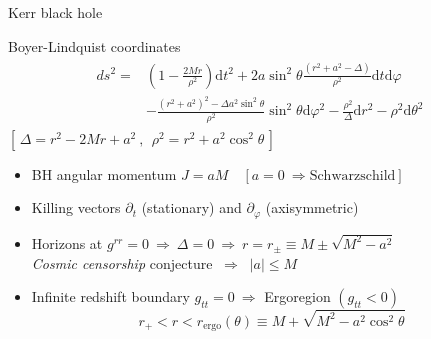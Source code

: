\documentclass[9pt]{beamer}
\newcommand{\dd}{\mathrm{d}}
\begin{document}
\begin{frame}[fragile]{Kerr black hole}

    \vspace{0.15cm}

    \begin{block}{Boyer-Lindquist coordinates}
        \begin{align*}
            \begin{split}
                ds^2 = & \left(1 - \frac{2 M r}{\rho^2} \right) \dd t^2 + 2 a \sin^2\theta \frac{(r^2+a^2-\Delta)}{\rho^2} \dd t \dd \varphi \\
                &- \frac{(r^2+a^2)^2- \Delta a^2 \sin^2\theta}{\rho^2} \sin^2\theta \dd\varphi^2 - \frac{\rho^2}{\Delta} \dd r^2 - \rho^2 \dd \theta^2
            \end{split}
        \end{align*}
        \centering
        $\scriptstyle [\,\Delta=r^2 - 2 M r + a^2 ~,~~ \rho^2 = r^2 + a^2 \cos^2\theta\,]$
    \end{block}

    \begin{itemize}
        \setlength\itemsep{0.8em}
        \item BH angular momentum $J = a M \quad\left[ a=0 ~\Rightarrow \text{Schwarzschild} \right]$ 
        \item Killing vectors $\partial_t$ (stationary) and $\partial_\varphi$ (axisymmetric)
        \item Horizons at $g^{rr}=0 ~\Rightarrow~ \Delta=0 ~\Rightarrow~ r = r_{\pm} \equiv M \pm \sqrt{M^2-a^2}$ \\
        \emph{Cosmic censorship} conjecture $~\Rightarrow~$ $|a| \le M$
        
        \item Infinite redshift boundary $g_{tt}=0 ~\Rightarrow$ \alert{Ergoregion} $(g_{tt}<0)$
        $$r_+<r<r_\mathrm{ergo}(\theta) \equiv M + \sqrt{M^2 - a^2 \cos^2\theta}$$
    \end{itemize}
\end{frame}
\end{document}
